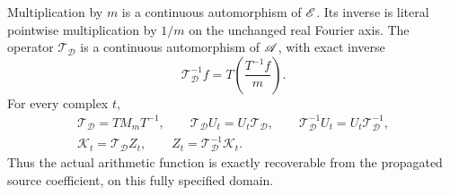 \begin{theorem}
\label{xat:automorphism}
Multiplication by \(m\) is a continuous automorphism of \(\mathscr E\).
Its inverse is literal pointwise multiplication by \(1/m\) on
the unchanged real Fourier axis. The operator
\(\mathcal T_{\mathcal D}\) is a continuous automorphism of
\(\mathscr A\), with exact inverse
\begin{equation}
\mathcal T_{\mathcal D}^{-1}f
 =T\left(\frac{T^{-1}f}{m}\right).
\label{xat:inverse}
\end{equation}
For every complex \(t\),
\begin{gather}
\mathcal T_{\mathcal D}=TM_mT^{-1},\qquad
\mathcal T_{\mathcal D}U_t=U_t\mathcal T_{\mathcal D},\qquad
\mathcal T_{\mathcal D}^{-1}U_t
        =U_t\mathcal T_{\mathcal D}^{-1},
\label{xat:commutation}\\
\mathcal K_t=\mathcal T_{\mathcal D}Z_t,
\qquad
Z_t=\mathcal T_{\mathcal D}^{-1}\mathcal K_t.
\label{xat:actual-inverse}
\end{gather}
Thus the actual arithmetic function is exactly recoverable from
the propagated source coefficient, on this fully specified domain.
\end{theorem}

